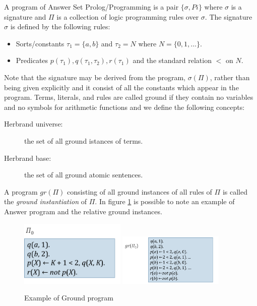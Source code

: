 A program of Answer Set Prolog/Programming is a pair $\{\sigma, Pi\}$ where $\sigma$ is a
signature and $\Pi$ is a collection of logic programming rules over $\sigma$.\newline
The signature $\sigma$ is defined by the following rules:
\begin{itemize}
    \item Sorts/constants $\tau_1 = \{a, b\}$ and $\tau_2 = N$ where $N = \{0, 1, \dots\}$.
    \item Predicates $p(\tau_1), q(\tau_1, \tau_2), r(\tau_1)$ and the standard relation
	  $<$ on $N$.
\end{itemize}
Note that the signature may be derived from the program, $\sigma(\Pi)$, rather than being
given explicitly and it consist of all the constants which appear in the program.\newline
Terms, literals, and rules are called ground if they contain no variables and no symbols
for arithmetic functions and we define the following concepts:
\begin{description}
    \item [Herbrand universe: ] the set of all ground istances of terms.
    \item [Herbrand base: ] the set of all ground atomic sentences.
\end{description}
A program $gr(\Pi)$ consisting of all ground instances of all rules of $\Pi$ 
is called the \emph{ground instantiation} of $\Pi$.\newline
In figure \ref{img:groundProgram} is possible to note an example of Answer program and 
the relative ground instances.
\begin{figure}
	\includegraphics[width=0.45\textwidth]{Images/exampleAnswer}
	\includegraphics[width=0.45\textwidth]{Images/exampleGround}
	\caption{Example of Ground program}
	\label{img:groundProgram}
\end{figure}

